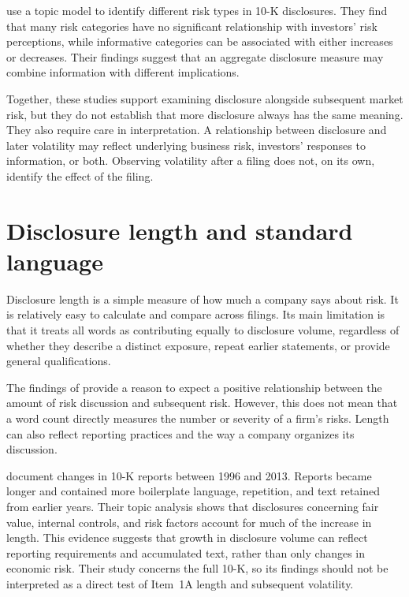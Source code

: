 \textcite{bao2014} use a topic model to identify different risk types in 10-K
disclosures. They find that many risk categories have no significant
relationship with investors' risk perceptions, while informative categories can
be associated with either increases or decreases. Their findings suggest that
an aggregate disclosure measure may combine information with different
implications.

Together, these studies support examining disclosure alongside subsequent
market risk, but they do not establish that more disclosure always has the
same meaning. They also require care in interpretation. A relationship between
disclosure and later volatility may reflect underlying business risk,
investors' responses to information, or both. Observing volatility after a
filing does not, on its own, identify the effect of the filing.

\section{Disclosure length and standard language}

Disclosure length is a simple measure of how much a company says about risk. It
is relatively easy to calculate and compare across filings. Its main
limitation is that it treats all words as contributing equally to disclosure
volume, regardless of whether they describe a distinct exposure, repeat earlier
statements, or provide general qualifications.

The findings of \textcite{campbell2014} provide a reason to expect a positive
relationship between the amount of risk discussion and subsequent risk.
However, this does not mean that a word count directly measures the number or
severity of a firm's risks. Length can also reflect reporting practices and the
way a company organizes its discussion.

\textcite{dyer2017} document changes in 10-K reports between 1996 and 2013.
Reports became longer and contained more boilerplate language, repetition, and
text retained from earlier years. Their topic analysis shows that disclosures
concerning fair value, internal controls, and risk factors account for much of
the increase in length. This evidence suggests that growth in disclosure volume
can reflect reporting requirements and accumulated text, rather than only
changes in economic risk. Their study concerns the full 10-K, so its findings
should not be interpreted as a direct test of Item~1A length and subsequent
volatility.

